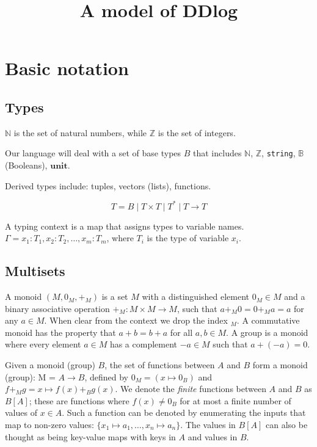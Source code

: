 \documentclass[10pt]{article}
\title{A model of DDlog}
\newcommand{\Z}{\mathbb{Z}}
\newcommand{\N}{\mathbb{N}}
\newcommand{\B}{\mathbb{B}}
\newcommand{\code}[1]{\texttt{#1}}
\newcommand{\multiset}[1]{\mathit{multiset}_{#1}}
\newcommand{\set}[1]{\mathit{set}_{#1}}
\begin{document}
\maketitle

\section{Basic notation}

\subsection{Types}

$\N$ is the set of natural numbers, while $\Z$ is the set of integers.

Our language will deal with a set of base types $B$ that includes
$\N$, $\Z$, \code{string}, $\B$ (Booleans), $\mathbf{unit}$.

Derived types include: tuples, vectors (lists), functions.

$$T = B \;|\; T \times T \;|\; T^* \;|\; T \rightarrow T$$


A typing context is a map that assigns types to variable names.
$\Gamma = x_1 : T_1, x_2 : T_2, \ldots, x_m : T_m$, where $T_i$ is the
type of variable $x_i$.

\subsection{Multisets}

A monoid $(M, 0_M, +_M)$ is a set $M$ with a distinguished element
$0_M \in M$ and a binary associative operation $+_M : M \times M
\rightarrow M$, such that $a +_M 0 = 0 +_M a = a$ for any $a \in M$.
When clear from the context we drop the index $_M$.  A commutative
monoid has the property that $a + b = b + a$ for all $a, b \in M$.  A
group is a monoid where every element $a \in M$ has a complement $-a
\in M$ such that $a + (-a) = 0$.

Given a monoid (group) $B$, the set of functions between $A$ and $B$
form a monoid (group): M = $A \rightarrow B$, defined by $0_M = (x
\mapsto 0_B)$ and $f +_M g = x \mapsto f(x) +_B g(x)$.  We denote the
\emph{finite} functions between $A$ and $B$ as $B[A]$; these are
functions where $f(x) \not= 0_B$ for at most a finite number of values
of $x \in A$.  Such a function can be denoted by enumerating the
inputs that map to non-zero values: $\{ x_1 \mapsto a_1, \dots, x_n
\mapsto a_n \}$.  The values in $B[A]$ can also be thought as being
key-value maps with keys in $A$ and values in $B$.
\end{document}

